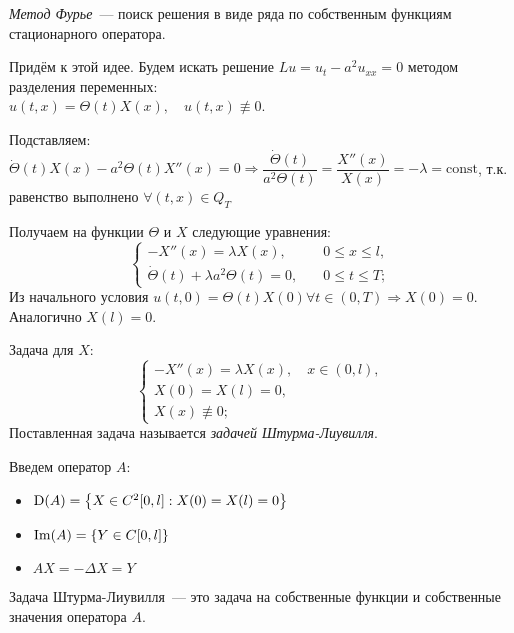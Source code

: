 {\it Метод Фурье}~--- поиск решения в виде ряда по собственным функциям стационарного оператора.

Придём к этой идее. Будем искать решение $Lu = u_t - a^2u_{xx} = 0$ методом разделения переменных: \\ $u(t,x) = \Theta(t) X(x), \quad u(t,x) \not\equiv 0$.

Подставляем: $\dot{\Theta}(t) X(x) - a^2\Theta(t) X''(x) = 0 \Rightarrow \dfrac{\dot{\Theta}(t)}{a^2\Theta(t)} = \dfrac{X''(x)}{X(x)} = -\lambda = \text{const}$, т.к. равенство выполнено $\forall (t,x) \in Q_T$

Получаем на функции $\Theta$ и $X$ следующие уравнения:
\begin{equation*}
	\begin{cases}
		-X''(x) = \lambda X(x), \quad & 0 \leq x \leq l, \\
		\dot{\Theta}(t) + \lambda a^2 \Theta(t) = 0, \quad & 0 \leq t \leq T;
	\end{cases}
\end{equation*}
Из начального условия $u(t,0) = \Theta(t)X(0) \forall t \in (0,T) \Rightarrow X(0) = 0$. Аналогично $X(l) = 0$.

Задача для $X$:
\begin{equation}
	\begin{cases}
		-X''(x) = \lambda X(x), \quad x \in (0,l), \\
		X(0) = X(l) = 0, \\
		X(x) \not\equiv 0;
	\end{cases}
\end{equation}
Поставленная задача называется {\it задачей Штурма-Лиувилля}.

Введем оператор $A$:
\begin{itemize}
	\item $\mathrm{D}(A) = \left\{X \in C^2[0,l] : X(0) = X(l) = 0\right\}$
	\item $\mathrm{Im}(A) = \left\{Y \in C[0,l]\right\}$
	\item $AX = -\Delta X = Y$
\end{itemize}

Задача Штурма-Лиувилля~--- это задача на собственные функции и собственные значения оператора $A$.

